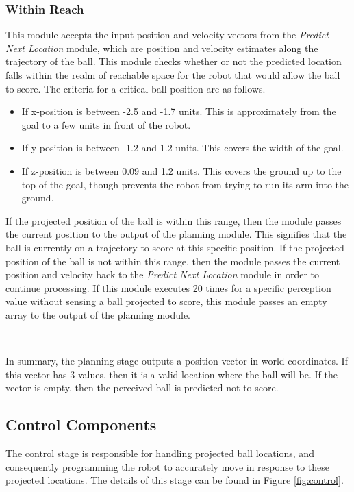 \documentclass{article}
\begin{document}
\subsubsection*{Within Reach}
This module accepts the input position and velocity vectors from the \emph{Predict Next Location} module, which are position and velocity estimates along the trajectory of the ball. This module checks whether or not the predicted location falls within the realm of reachable space for the robot that would allow the ball to score. The criteria for a critical ball position are as follows.
\begin{itemize}
\item If x-position is between -2.5 and -1.7 units. This is approximately from the goal to a few units in front of the robot.
\item If y-position is between -1.2 and 1.2 units. This covers the width of the goal.
\item If z-position is between 0.09 and 1.2 units. This covers the ground up to the top of the goal, though prevents the robot from trying to run its arm into the ground.
\end{itemize}
If the projected position of the ball is within this range, then the module passes the current position to the output of the planning module. This signifies that the ball is currently on a trajectory to score at this specific position. If the projected position of the ball is not within this range, then the module passes the current position and velocity back to the \emph{Predict Next Location} module in order to continue processing. If this module executes 20 times for a specific perception value without sensing a ball projected to score, this module passes an empty array to the output of the planning module. \par ~ \par

In summary, the planning stage outputs a position vector in world coordinates. If this vector has 3 values, then it is a valid location where the ball will be. If the vector is empty, then the perceived ball is predicted not to score.


\subsection{Control Components}
The control stage is responsible for handling projected ball locations, and consequently programming the robot to accurately move in response to these projected locations. The details of this stage can be found in Figure \ref{fig:control}. 
\end{document}

